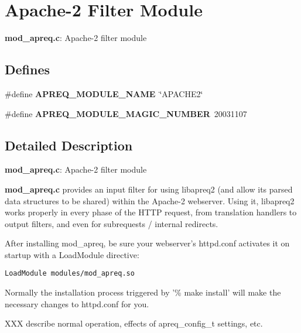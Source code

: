\section{Apache-2 Filter Module}
\label{group__mod__apreq}
{\bf mod\_\-apreq.c}: Apache-2 filter module 
\subsection*{Defines}
\begin{CompactItemize}
\item 
\#define {\bf APREQ\_\-MODULE\_\-NAME}\ \char`\"{}APACHE2\char`\"{}\label{group__mod__apreq_a16}

\item 
\#define {\bf APREQ\_\-MODULE\_\-MAGIC\_\-NUMBER}\ 20031107\label{group__mod__apreq_a17}

\end{CompactItemize}


\subsection{Detailed Description}
{\bf mod\_\-apreq.c}: Apache-2 filter module

{\bf mod\_\-apreq.c} provides an input filter for using libapreq2 (and allow its parsed data structures to be shared) within the Apache-2 webserver. Using it, libapreq2 works properly in every phase of the HTTP request, from translation handlers to output filters, and even for subrequests / internal redirects.

After installing mod\_\-apreq, be sure your webserver's httpd.conf activates it on startup with a Load\-Module directive: \small\begin{alltt}{\tt }\end{alltt}\normalsize 


\small\begin{alltt}{\tt      LoadModule modules/mod_apreq.so}\end{alltt}\normalsize 


\small\begin{alltt}{\tt  }\end{alltt}\normalsize 
 Normally the installation process triggered by '\% make install' will make the necessary changes to httpd.conf for you.

XXX describe normal operation, effects of apreq\_\-config\_\-t settings, etc.